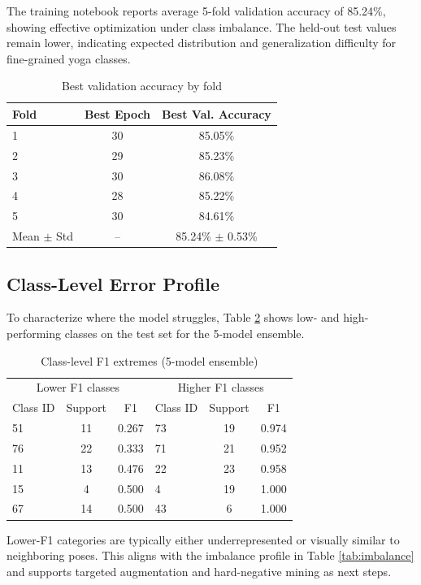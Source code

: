 \documentclass[conference]{IEEEtran}
\begin{document}
The training notebook reports average 5-fold validation accuracy of 85.24\%, showing effective optimization under class imbalance. The held-out test values remain lower, indicating expected distribution and generalization difficulty for fine-grained yoga classes.

\begin{table}[t]
\caption{Best validation accuracy by fold}
\label{tab:foldwise}
\centering
\begin{tabular}{lcc}
\toprule
Fold & Best Epoch & Best Val. Accuracy \\
\midrule
1 & 30 & 85.05\% \\
2 & 29 & 85.23\% \\
3 & 30 & 86.08\% \\
4 & 28 & 85.22\% \\
5 & 30 & 84.61\% \\
\midrule
Mean $\pm$ Std & -- & 85.24\% $\pm$ 0.53\% \\
\bottomrule
\end{tabular}
\end{table}

\subsection{Class-Level Error Profile}
To characterize where the model struggles, Table \ref{tab:class_extremes} shows low- and high-performing classes on the test set for the 5-model ensemble.

\begin{table}[t]
\caption{Class-level F1 extremes (5-model ensemble)}
\label{tab:class_extremes}
\centering
\begin{tabular}{lcc|lcc}
\toprule
\multicolumn{3}{c|}{Lower F1 classes} & \multicolumn{3}{c}{Higher F1 classes} \\
Class ID & Support & F1 & Class ID & Support & F1 \\
\midrule
51 & 11 & 0.267 & 73 & 19 & 0.974 \\
76 & 22 & 0.333 & 71 & 21 & 0.952 \\
11 & 13 & 0.476 & 22 & 23 & 0.958 \\
15 & 4  & 0.500 & 4  & 19 & 1.000 \\
67 & 14 & 0.500 & 43 & 6  & 1.000 \\
\bottomrule
\end{tabular}
\end{table}

Lower-F1 categories are typically either underrepresented or visually similar to neighboring poses. This aligns with the imbalance profile in Table \ref{tab:imbalance} and supports targeted augmentation and hard-negative mining as next steps.
\end{document}
